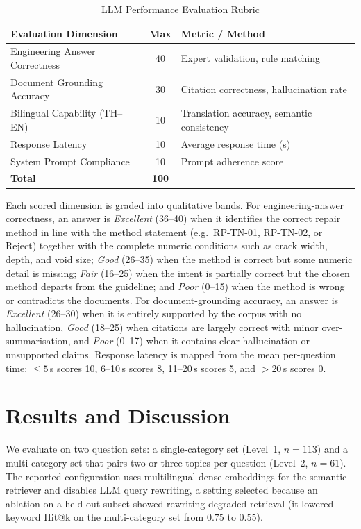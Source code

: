 \documentclass[10pt,a4paper,conference]{IEEEtran}
\begin{document}
\begin{table}[htbp]
\caption{LLM Performance Evaluation Rubric}
\begin{center}
\begin{tabular}{|p{}|c|p{}|}
\hline
\textbf{Evaluation Dimension} & \textbf{Max} & \textbf{Metric / Method} \\
\hline
Engineering Answer Correctness & 40 & Expert validation, rule matching \\
\hline
Document Grounding Accuracy & 30 & Citation correctness, hallucination rate \\
\hline
Bilingual Capability (TH--EN) & 10 & Translation accuracy, semantic consistency \\
\hline
Response Latency & 10 & Average response time (s) \\
\hline
System Prompt Compliance & 10 & Prompt adherence score \\
\hline
\textbf{Total} & \textbf{100} & \\
\hline
\end{tabular}
\label{tab:rubric}
\end{center}
\end{table}

Each scored dimension is graded into qualitative bands. For
engineering-answer correctness, an answer is \emph{Excellent} (36--40) when it
identifies the correct repair method in line with the method statement
(e.g.\ RP-TN-01, RP-TN-02, or Reject) together with the complete numeric
conditions such as crack width, depth, and void size; \emph{Good} (26--35) when
the method is correct but some numeric detail is missing; \emph{Fair} (16--25)
when the intent is partially correct but the chosen method departs from the
guideline; and \emph{Poor} (0--15) when the method is wrong or contradicts the
documents. For document-grounding accuracy, an answer is \emph{Excellent}
(26--30) when it is entirely supported by the corpus with no hallucination,
\emph{Good} (18--25) when citations are largely correct with minor
over-summarisation, and \emph{Poor} (0--17) when it contains clear
hallucination or unsupported claims. Response latency is mapped from the mean
per-question time: $\le 5$\,s scores 10, 6--10\,s scores 8, 11--20\,s scores 5,
and $>20$\,s scores 0.

\section{Results and Discussion}
We evaluate on two question sets: a single-category set (Level~1, $n=113$) and a
multi-category set that pairs two or three topics per question (Level~2,
$n=61$). The reported configuration uses multilingual dense embeddings for the
semantic retriever and disables LLM query rewriting, a setting selected because
an ablation on a held-out subset showed rewriting degraded retrieval (it lowered
keyword Hit@k on the multi-category set from $0.75$ to $0.55$).
\end{document}
